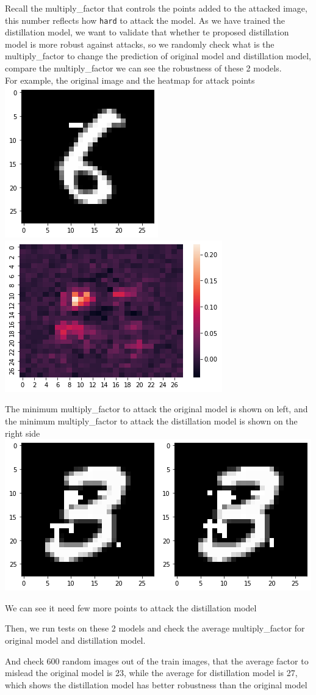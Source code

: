 \documentclass[
]{article}
\begin{document}
\begin{enumerate}
  Recall the multiply\_factor that controls the points added to the
  attacked image, this number reflects how \texttt{hard} to attack the
  model. As we have trained the distillation model, we want to validate
  that whether te proposed distillation model is more robust against
  attacks, so we randomly check what is the multiply\_factor to change
  the prediction of original model and distillation model, compare the
  multiply\_factor we can see the robustness of these 2 models.\\
  For example, the original image and the heatmap for attack points
  \includegraphics[width=0.25\columnwidth]{assets/output5.png} \includegraphics[width=0.5\columnwidth]{assets/output7.png}

  The minimum multiply\_factor to attack the original model is shown on
  left, and the minimum multiply\_factor to attack the distillation
  model is shown on the right side\\
  \includegraphics[width=0.25\columnwidth]{assets/output8.png}\includegraphics[width=0.25\columnwidth]{assets/output9.png}

  We can see it need few more points to attack the distillation model

  Then, we run tests on these 2 models and check the average
  multiply\_factor for original model and distillation model.

  And check 600 random images out of the train images, that the average
  factor to mislead the original model is 23, while the average for
  distillation model is 27, which shows the distillation model has
  better robustness than the original model
\end{enumerate}
\end{document}
